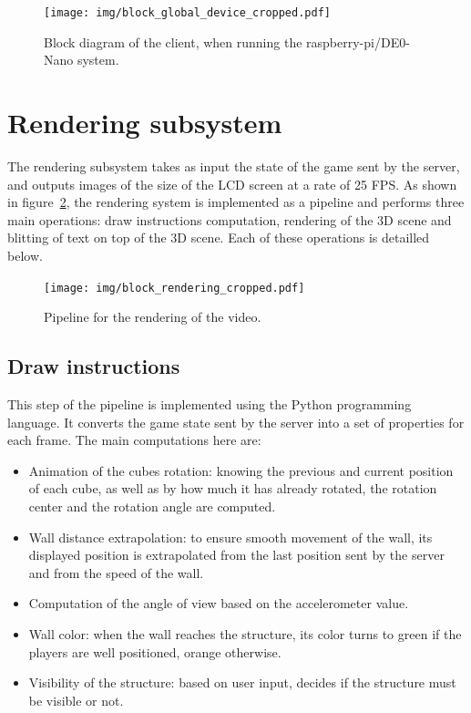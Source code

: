 \documentclass[english, DIV=13]{scrreprt}
\begin{document}
\begin{figure}[bth]
    \centering
    \texttt{[image: img/block\_global\_device\_cropped.pdf]}
    \caption{Block diagram of the client, when running the raspberry-pi/DE0-Nano system.}
    \label{fig:global-device}
\end{figure}

\section{Rendering subsystem}
\label{sec:rendering}

The rendering subsystem takes as input the state of the game sent by the server,
and outputs images of the size of the LCD screen at a rate
of 25 FPS. As shown in figure~\ref{fig:rendering}, the rendering system is
implemented as a pipeline and performs three main operations: draw instructions
computation, rendering of the 3D scene and blitting of text on top of the 3D scene.
Each of these operations is detailled below.

\begin{figure}[bth]
    \centering
    \texttt{[image: img/block\_rendering\_cropped.pdf]}
    \caption{Pipeline for the rendering of the video.}
    \label{fig:rendering}
\end{figure}

\subsection{Draw instructions}

This step of the pipeline is implemented using the Python programming language.
It converts the game state sent by the server into a set of properties for each
frame. The main computations here are:
\begin{itemize}
    \item Animation of the cubes rotation: knowing the previous and current
    position of each cube, as well as by how much it has already rotated, the rotation
    center and the rotation angle are computed.
    \item Wall distance extrapolation: to ensure smooth movement of the wall, its
    displayed position is extrapolated from the last position sent by the server
    and from the speed of the wall.
    \item Computation of the angle of view based on the accelerometer value.
    \item Wall color: when the wall reaches the structure, its color turns to green
    if the players are well positioned, orange otherwise.
    \item Visibility of the structure: based on user input, decides if the structure
    must be visible or not.
\end{itemize}
\end{document}
